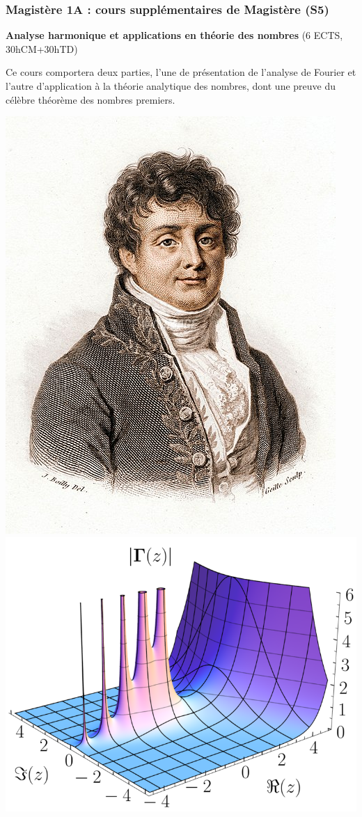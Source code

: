 \documentclass[slidetop,11pt]{beamer}
\begin{document}
\begin{frame}
\frametitle{Magistère 1A : cours supplémentaires de Magistère (S5)}

\textbf{Analyse harmonique et applications en théorie des nombres} (6 ECTS, 30hCM+30hTD)

Ce cours comportera deux parties, l'une de présentation de l'analyse de Fourier et l'autre d'application à la théorie analytique des nombres, dont une preuve du célèbre théorème des nombres premiers.
\begin{center}
\includegraphics[scale=.2]{images/fourier2.jpg} 
\includegraphics[scale=.2]{images/Gamma_abs_3D.png}
\end{center}

\end{frame}
\end{document}
